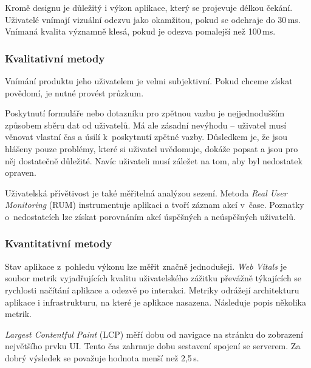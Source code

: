 Kromě designu je důležitý i výkon aplikace, který se projevuje délkou čekání.
Uživatelé vnímají vizuální odezvu jako okamžitou, pokud se odehraje do 30\,ms.
Vnímaná kvalita významně klesá, pokud je odezva pomalejší než 100\,ms. \cite{interactivityDelay}


\subsubsection{Kvalitativní metody}

Vnímání produktu jeho uživatelem je velmi subjektivní.
Pokud chceme získat povědomí, je nutné provést průzkum.

Poskytnutí formuláře nebo dotazníku pro zpětnou vazbu je nejjednodušším způsobem sběru dat od uživatelů.
Má ale zásadní nevýhodu -- uživatel musí věnovat vlastní čas a úsilí k~poskytnutí zpětné vazby.
Důsledkem je, že jsou hlášeny pouze problémy, které si uživatel uvědomuje, dokáže popsat a jsou pro něj dostatečně důležité.
Navíc uživateli musí záležet na tom, aby byl nedostatek opraven.

Uživatelská přívětivost je také měřitelná analýzou sezení.
Metoda \emph{Real User Monitoring} (RUM) instrumentuje aplikaci a tvoří záznam akcí v~čase.
Poznatky o~nedostatcích lze získat porovnáním akcí úspěšných a neúspěšných uživatelů.


\subsubsection{Kvantitativní metody}
\label{kvantMethods}


Stav aplikace z~pohledu výkonu lze měřit značně jednodušeji.
\emph{Web Vitals} je soubor metrik vyjadřujících kvalitu uživatelského zážitku převážně týkajících se rychlosti načítání aplikace a odezvě po interakci.
Metriky odrážejí architekturu aplikace i infrastrukturu, na které je aplikace nasazena.
Následuje popis několika metrik.

\emph{Largest Contentful Paint} (LCP) měří dobu od navigace na stránku do zobrazení největšího prvku UI.
Tento čas zahrnuje dobu sestavení spojení se serverem.
Za dobrý výsledek se považuje hodnota menší než 2,5\,s.

